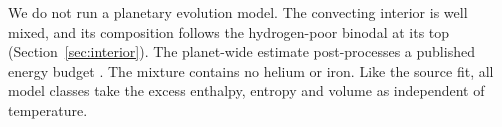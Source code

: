 We do not run a planetary evolution model. The convecting interior is well mixed, and its
composition follows the hydrogen-poor binodal at its top (Section~\ref{sec:interior}). The
planet-wide estimate post-processes a published energy budget \cite{rogers2025}. The mixture
contains no helium or iron. Like the source fit, all model classes take the excess enthalpy,
entropy and volume as independent of temperature.
